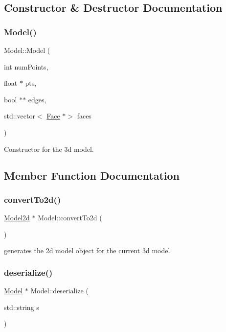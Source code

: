 \subsection{Constructor \& Destructor Documentation}
\mbox{\label{class_model_a39cf79e51da0f52f1031f98f1bebd118}} 
\subsubsection{\texorpdfstring{Model()}{Model()}}
{\footnotesize\ttfamily Model\+::\+Model (\begin{DoxyParamCaption}\item[{int}]{num\+Points,  }\item[{float $\ast$}]{pts,  }\item[{bool $\ast$$\ast$}]{edges,  }\item[{std\+::vector$<$ \mbox{\hyperlink{class_face}{Face}} $\ast$$>$}]{faces }\end{DoxyParamCaption})}



Constructor for the 3d model. 



\subsection{Member Function Documentation}
\mbox{\label{class_model_ac62fb1874a6597955c89fe3a9a1663e1}} 
\subsubsection{\texorpdfstring{convert\+To2d()}{convertTo2d()}}
{\footnotesize\ttfamily \mbox{\hyperlink{class_model2d}{Model2d}} $\ast$ Model\+::convert\+To2d (\begin{DoxyParamCaption}{ }\end{DoxyParamCaption})}



generates the 2d model object for the current 3d model 

\mbox{\label{class_model_a98946d1c8d49b43f541dbd6b98b31e52}} 
\subsubsection{\texorpdfstring{deserialize()}{deserialize()}}
{\footnotesize\ttfamily \mbox{\hyperlink{class_model}{Model}} $\ast$ Model\+::deserialize (\begin{DoxyParamCaption}\item[{std\+::string}]{s }\end{DoxyParamCaption})\hspace{0.3cm}{\ttfamily [static]}}



